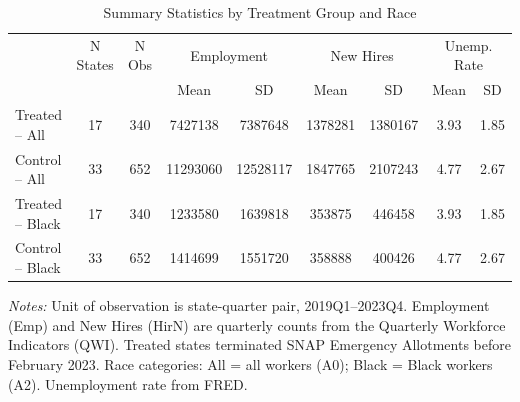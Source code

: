 \begin{table}[htbp]
\centering
\caption{Summary Statistics by Treatment Group and Race}
\label{tab:summary}
\begin{adjustbox}{max width=\textwidth}
\begin{threeparttable}
\begin{tabular}{lcccccccc}
\hline\hline
 & N States & N Obs & \multicolumn{2}{c}{Employment} & \multicolumn{2}{c}{New Hires} & \multicolumn{2}{c}{Unemp. Rate} \\
\cmidrule(lr){4-5}\cmidrule(lr){6-7}\cmidrule(lr){8-9}
 & & & Mean & SD & Mean & SD & Mean & SD \\
\hline
Treated -- All & 17 & 340 & 7427138 & 7387648 & 1378281 & 1380167 & 3.93 & 1.85 \\
Control -- All & 33 & 652 & 11293060 & 12528117 & 1847765 & 2107243 & 4.77 & 2.67 \\
Treated -- Black & 17 & 340 & 1233580 & 1639818 & 353875 & 446458 & 3.93 & 1.85 \\
Control -- Black & 33 & 652 & 1414699 & 1551720 & 358888 & 400426 & 4.77 & 2.67 \\
\hline\hline
\end{tabular}
\begin{tablenotes}[flushleft]
\footnotesize
\textit{Notes:} Unit of observation is state-quarter pair, 2019Q1--2023Q4. Employment (Emp) and New Hires (HirN) are quarterly counts from the Quarterly Workforce Indicators (QWI). Treated states terminated SNAP Emergency Allotments before February 2023. Race categories: All = all workers (A0); Black = Black workers (A2). Unemployment rate from FRED.
\end{tablenotes}
\end{threeparttable}
\end{adjustbox}
\end{table}
